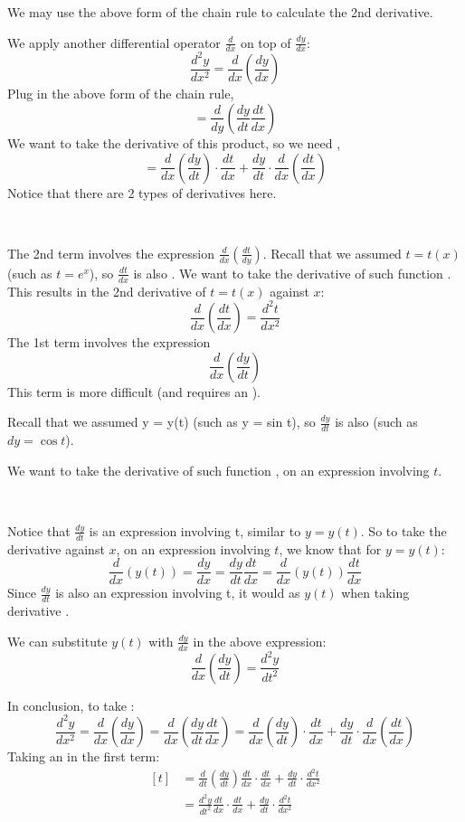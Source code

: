 \documentclass[11pt,fleqn]{book} %
\begin{document}
We may use the above form of the chain rule to calculate the 2nd derivative.

We apply another differential operator $\frac{d}{dx}$ on top of $\frac{dy}{dx}$: $$\frac{d^2y}{dx^2} = \frac{d}{dx} \left( \frac{dy}{dx} \right)$$ Plug in the above form of the chain rule, $$= \frac{d}{dy} \left( \frac{dy}{dt} \frac{dt}{dx} \right)$$ We want to take the derivative of this product, so we need , $$= \frac{d}{dx}\left( \frac{dy}{dt} \right) \cdot \frac{dt}{dx} + \frac{dy}{dt} \cdot \frac{d}{dx} \left( \frac{dt}{dx} \right)$$ Notice that there are 2 types of derivatives here.

{~~~}

The 2nd term involves the expression $\frac{d}{dx} \left( \frac{dt}{dy} \right)$. Recall that we assumed $t = t(x)$ (such as $t = e^x$), so $\frac{dt}{dx}$ is also . We want to take the derivative of such function . This results in the 2nd derivative of $t = t(x)$ against $x$: $$\frac{d}{dx} \left( \frac{dt}{dx} \right) = \frac{d^2t}{dx^2}$$ The 1st term involves the expression $$\frac{d}{dx} \left( \frac{dy}{dt} \right)$$ This term is more difficult (and requires an ). 

Recall that we assumed y = y(t) (such as y = sin t), so $\frac{dy}{dt}$ is also  (such as $dy = \cos t$). 

We want to take the derivative of such function , on an expression involving $t$.

{~~~}

Notice that $\frac{dy}{dt}$ is an expression involving t, similar to $y = y(t)$. So to take the derivative against $x$, on an expression involving $t$, we know that for $y = y(t)$: $$\frac{d}{dx} \left( y(t) \right) = \frac{dy}{dx} = \frac{dy}{dt} \frac{dt}{dx} = \frac{d}{dx} \left( y(t) \right) \frac{dt}{dx}$$ Since $\frac{dy}{dt}$ is also an expression involving t, it would  as $y(t)$ when taking derivative .

We can substitute $y(t)$ with $\frac{dy}{dx}$ in the above expression: $$\frac{d}{dx} \left( \frac{dy}{dt} \right) = \frac{d^2y}{dt^2}$$ 

In conclusion, to take : $$\frac{d^2y}{dx^2} = \frac{d}{dx} \left( \frac{dy}{dx} \right) = \frac{d}{dx} \left( \frac{dy}{dt} \frac{dt}{dx} \right) = \frac{d}{dx} \left( \frac{dy}{dt} \right) \cdot \frac{dt}{dx} + \frac{dy}{dt} \cdot \frac{d}{dx} \left( \frac{dt}{dx} \right)$$ Taking an  in the first term: 
$$\begin{aligned}[t]
    & = \frac{d}{dt} \left( \frac{dy}{dt} \right) \frac{dt}{dx} \cdot \frac{dt}{dx} + \frac{dy}{dt} \cdot \frac{d^2t}{dx^2} \\ 
    & = \frac{d^2y}{dt^2} \frac{dt}{dx} \cdot \frac{dt}{dx} + \frac{dy}{dt} \cdot \frac{d^2t}{dx^2}
\end{aligned}$$
\end{document}
